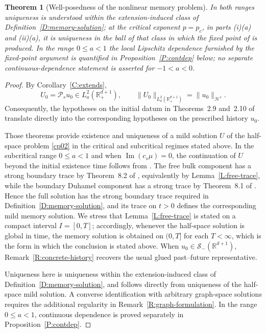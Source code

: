 \documentclass[11pt,letter]{amsart}
\def \RNu {\mathbb{R}^{d+1}}
\def \RN {\mathbb{R}_+^{d+1}}
\numberwithin{equation}{section}
\newcommand{\Sm}{\mathscr S_-(\RNu)}
\newtheorem{theorem}{Theorem}[section]
\numberwithin{equation}{section}
\begin{document}
\begin{theorem}[Well-posedness of the nonlinear memory problem]
\smallskip
\noindent
In both ranges uniqueness is understood within the extension-induced class of
Definition~\ref{D:memory-solution}; at the critical exponent $p=p_c$, in parts
(i)(a) and (ii)(a), it is uniqueness in the ball of that class in which the
fixed point of \cite[Theorems~2.9(1) and~2.10(1)]{GS2} is produced.
In the range $0\le a<1$ the local Lipschitz
dependence furnished by the fixed-point argument is quantified in
Proposition~\ref{P:contdep} below; no separate continuous-dependence statement
is asserted for $-1<a<0$.
\end{theorem}

\begin{proof}
By Corollary~\ref{C:extends},
\[
U_0=\mathcal P_su_0\in L_a^2(\RN),
\qquad
\|U_0\|_{L_a^2(\RN)}
=
\|u_0\|_{\mathcal H^s}.
\]
Consequently, the hypotheses on the initial datum in Theorems~2.9
and~2.10 of \cite{GS2} translate directly into the corresponding
hypotheses on the prescribed history $u_0$.

Those theorems provide existence and uniqueness of a mild solution
$U$ of the half-space problem \eqref{cp02} in the critical and
subcritical regimes stated above. In the subcritical range $0\le a<1$ and
when $\operatorname{Im}(c_s\mu)=0$, the continuation of $U$ beyond the initial
existence time follows from \cite[Theorem~2.9(2)]{GS2}. The free bulk component
has a strong boundary trace by Theorem~8.2 of \cite{GS2}, equivalently by
Lemma~\ref{L:free-trace}, while the boundary
Duhamel component has a strong trace by Theorem~8.1 of \cite{GS2}. Hence the
full solution has the strong boundary trace required in
Definition~\ref{D:memory-solution}, and its trace on $t>0$ defines the
corresponding mild memory solution. We stress that
Lemma~\ref{L:free-trace} is stated on a compact interval $I=[0,T]$; accordingly,
whenever the half-space solution is global in time, the memory solution is
obtained on $(0,T]$ for each $T<\infty$, which is the form in which the
conclusion is stated above. When $u_0\in\Sm$,
Remark~\ref{R:concrete-history} recovers the usual glued past--future representative.

Uniqueness here is uniqueness within the extension-induced class of
Definition~\ref{D:memory-solution}, and follows directly from uniqueness of
the half-space mild solution. A converse identification with arbitrary
graph-space solutions requires the additional regularity in
Remark~\ref{R:graph-formulation}. In the range $0\le a<1$, continuous dependence
is proved separately in Proposition~\ref{P:contdep}.

\end{proof}
\end{document}
